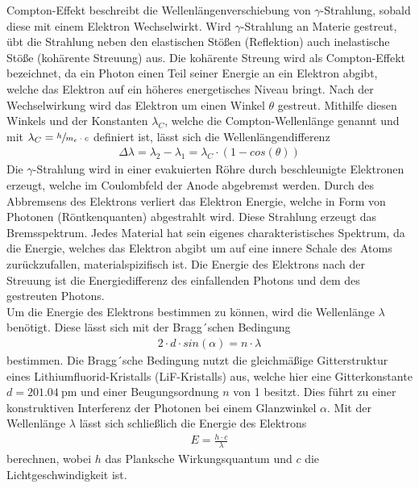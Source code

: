     \justifying Compton-Effekt beschreibt die Wellenlängenverschiebung von $\gamma$-Strahlung, sobald diese mit einem Elektron Wechselwirkt. 
    Wird $\gamma$-Strahlung an Materie gestreut, übt die Strahlung neben den elastischen Stößen (Reflektion) auch inelastische Stöße (kohärente Streuung) aus. 
    Die kohärente Streung wird als Compton-Effekt bezeichnet, da ein Photon einen Teil seiner Energie an ein Elektron abgibt, welche das Elektron auf ein 
    höheres energetisches Niveau bringt. Nach der Wechselwirkung wird das Elektron um einen Winkel $\theta$ gestreut. Mithilfe diesen Winkels und der Konstanten
    $\lambda_C$, welche die Compton-Wellenlänge genannt und mit $\lambda_C = \sfrac{h}{m_e \cdot c}$ definiert ist, lässt sich die Wellenlängendifferenz
    \begin{align}
        \Delta \lambda = \lambda_2 - \lambda_1 = \lambda_C \cdot (1-cos(\theta)) \label{eq:1}
    \end{align}
    \justifying Die $\gamma$-Strahlung wird in einer evakuierten Röhre durch beschleunigte Elektronen erzeugt, welche im Coulombfeld der Anode
    abgebremst werden. Durch des Abbremsens des Elektrons verliert das Elektron Energie, welche in Form von Photonen (Röntkenquanten) abgestrahlt wird. Diese Strahlung
    erzeugt das Bremsspektrum. Jedes Material hat sein eigenes charakteristisches Spektrum, da die Energie, welches das Elektron abgibt um auf eine innere Schale des 
    Atoms zurückzufallen, materialspizifisch ist. Die Energie des Elektrons nach der Streuung ist die Energiedifferenz des einfallenden Photons und dem des gestreuten 
    Photons.\\
    Um die Energie des Elektrons bestimmen zu können, wird die Wellenlänge $\lambda$ benötigt. Diese lässt sich mit der Bragg´schen Bedingung \cite{V603}
    \begin{align}
        2 \cdot d \cdot sin(\alpha) = n \cdot \lambda \label{eq:2}
    \end{align}
    bestimmen. Die Bragg´sche Bedingung nutzt die gleichmäßige Gitterstruktur eines Lithiumfluorid-Kristalls (LiF-Kristalls) aus, welche hier eine Gitterkonstante $d = \SI{201.04}
    {\pico\meter}$ und einer Beugungsordnung $n$ von 1 besitzt. Dies führt zu einer konstruktiven Interferenz der Photonen bei einem Glanzwinkel $\alpha$. Mit der Wellenlänge
    $\lambda$ lässt sich schließlich die Energie des Elektrons
    \begin{align}
        E = \frac{h \cdot c}{\lambda} \label{eq:3}
    \end{align}
    berechnen, wobei $h$ das Planksche Wirkungsquantum und $c$ die Lichtgeschwindigkeit ist. 



